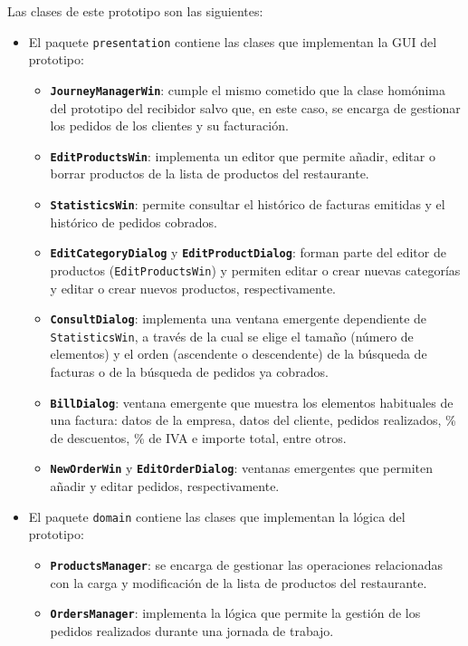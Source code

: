 Las clases de este prototipo son las siguientes:
\begin{itemize}
\item El paquete \texttt{presentation} contiene las clases que implementan
la \acs{GUI} del prototipo:
  \begin{itemize}
  \item \textbf{\texttt{JourneyManagerWin}}: cumple el mismo cometido que la 
  clase homónima del prototipo del recibidor salvo que, en este caso, se encarga
  de gestionar los pedidos de los clientes y su facturación.
  \item \textbf{\texttt{EditProductsWin}}: implementa un editor que permite 
  añadir, editar o borrar productos de la lista de productos del restaurante.
  \item \textbf{\texttt{StatisticsWin}}: permite consultar el histórico de 
  facturas emitidas y el histórico de pedidos cobrados.
  \item \texttt{\textbf{EditCategoryDialog}} y
  \textbf{\texttt{EditProductDialog}}: forman
  parte del editor de productos (\texttt{EditProductsWin}) y permiten editar
  o crear nuevas categorías y editar o crear nuevos productos, respectivamente.
  \item \textbf{\texttt{ConsultDialog}}: implementa una ventana emergente 
  dependiente de \texttt{StatisticsWin}, a través de la cual se elige el tamaño 
  (número de elementos) y el orden (ascendente o descendente) de la búsqueda de 
  facturas o de la búsqueda de pedidos ya cobrados.
  \item \textbf{\texttt{BillDialog}}: ventana emergente que muestra los 
  elementos habituales de una factura: datos de la empresa, datos del cliente, 
  pedidos realizados, \% de descuentos, \% de IVA e importe total, entre otros.
  \item \textbf{\texttt{NewOrderWin}} y \textbf{\texttt{EditOrderDialog}}: 
  ventanas emergentes que permiten añadir y editar pedidos, respectivamente.
  \end{itemize}
\item El paquete \texttt{domain} contiene las clases que implementan la lógica
del prototipo:
  \begin{itemize}
  \item \textbf{\texttt{ProductsManager}}: se encarga de gestionar las 
  operaciones relacionadas con la carga y modificación de la lista de productos 
  del restaurante.
  \item \textbf{\texttt{OrdersManager}}: implementa la lógica que permite la 
  gestión de los pedidos realizados durante una jornada de trabajo.

\end{itemize}
\end{itemize}
